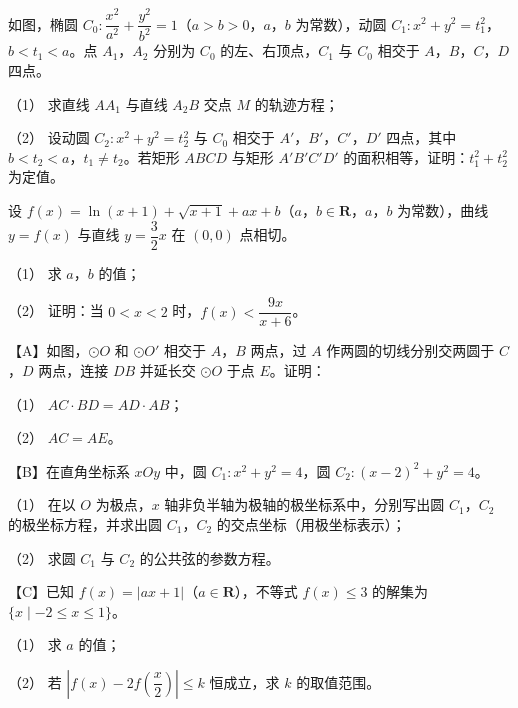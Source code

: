 \begin{question}
如图，椭圆 $C_0:\dfrac{x^2}{a^2}+\dfrac{y^2}{b^2}=1$（$a>b>0$，$a$，$b$ 为常数），动圆 $C_1:x^2+y^2=t_1^2$，$b<t_1<a$。点 $A_1$，$A_2$ 分别为 $C_0$ 的左、右顶点，$C_1$ 与 $C_0$ 相交于 $A$，$B$，$C$，$D$ 四点。
\nopagebreak[4]
\begin{center}\end{center}
\nopagebreak[4]
（1） 求直线 $AA_1$ 与直线 $A_2B$ 交点 $M$ 的轨迹方程；

（2） 设动圆 $C_2:x^2+y^2=t_2^2$ 与 $C_0$ 相交于 $A'$，$B'$，$C'$，$D'$ 四点，其中 $b<t_2<a$，$t_1\neq t_2$。若矩形 $ABCD$ 与矩形 $A'B'C'D'$ 的面积相等，证明：$t_1^2+t_2^2$ 为定值。

\end{question}
\begin{question}
设 $f(x)=\ln(x+1)+\sqrt{x+1}+ax+b$（$a$，$b\in\mathbf R$，$a$，$b$ 为常数），曲线 $y=f(x)$ 与直线 $y=\dfrac32x$ 在 $(0,0)$ 点相切。

（1） 求 $a$，$b$ 的值；

（2） 证明：当 $0<x<2$ 时，$f(x)<\dfrac{9x}{x+6}$。

\end{question}

\Needspace{0.4\textheight}
\begin{question}
【A】如图，$\odot O$ 和 $\odot O'$ 相交于 $A$，$B$ 两点，过 $A$ 作两圆的切线分别交两圆于 $C$，$D$ 两点，连接 $DB$ 并延长交 $\odot O$ 于点 $E$。证明：
\nopagebreak[4]
\begin{center}\end{center}
\nopagebreak[4]
（1） $AC\cdot BD=AD\cdot AB$；

（2） $AC=AE$。

\end{question}
\begin{question}
【B】在直角坐标系 $xOy$ 中，圆 $C_1:x^2+y^2=4$，圆 $C_2:(x-2)^2+y^2=4$。

（1） 在以 $O$ 为极点，$x$ 轴非负半轴为极轴的极坐标系中，分别写出圆 $C_1$，$C_2$ 的极坐标方程，并求出圆 $C_1$，$C_2$ 的交点坐标（用极坐标表示）；

（2） 求圆 $C_1$ 与 $C_2$ 的公共弦的参数方程。

\end{question}
\begin{question}
【C】已知 $f(x)=|ax+1|$（$a\in\mathbf R$），不等式 $f(x)\leqslant 3$ 的解集为 $\{x\mid -2\leqslant x\leqslant 1\}$。

（1） 求 $a$ 的值；

（2） 若 $\left|f(x)-2f\left(\dfrac x2\right)\right|\leqslant k$ 恒成立，求 $k$ 的取值范围。

\end{question}